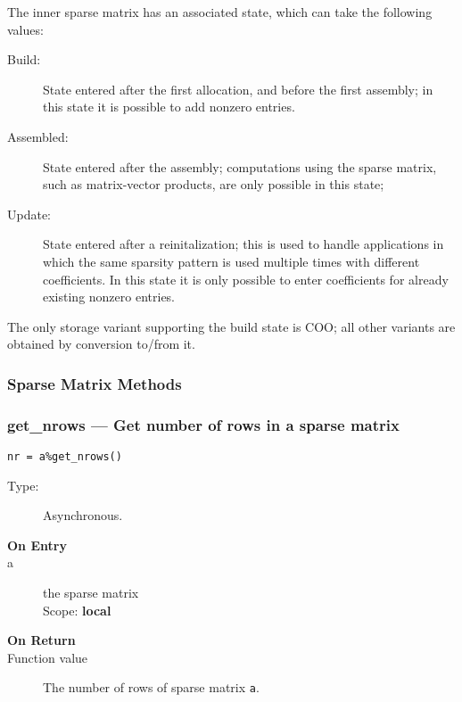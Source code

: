 The inner sparse matrix has an associated state, which can take the
following values:
\begin{description}
\item[Build:] State entered after the first allocation, and before the
  first assembly; in this state it is possible to add nonzero entries.
\item[Assembled:] State entered after the assembly; computations using
  the sparse matrix, such as matrix-vector products, are only possible
  in this state;
\item[Update:] State entered after a reinitalization; this is used to
  handle applications in which the same sparsity pattern is used
  multiple times with different coefficients. In this state it is only
  possible to enter coefficients for already existing nonzero entries.
\end{description}
The only storage variant supporting the build state is COO; all other
variants are obtained by conversion to/from it. 

\subsubsection{Sparse Matrix Methods}

\subsubsection*{get\_nrows --- Get number of  rows in a sparse  matrix}

\begin{verbatim}
nr = a%get_nrows()
\end{verbatim}

\begin{description}
\item[Type:] Asynchronous.
\item[\bf On Entry]
\item[a] the sparse matrix\\
Scope: {\bf local}\\
\end{description}

\begin{description}
\item[\bf On Return]
\item[Function value] The number of  rows  of sparse matrix \verb|a|.
\end{description}


